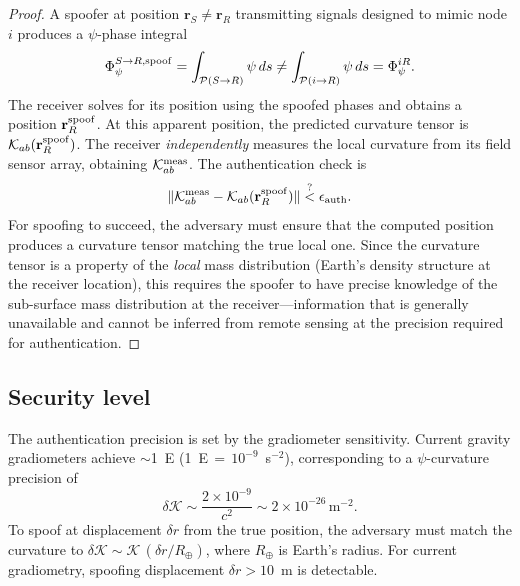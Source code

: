\documentclass[aps,prd,twocolumn,superscriptaddress,nofootinbib]{revtex4-2}
\begin{document}
\begin{proof}
A spoofer at position $\mathbf{r}_S \neq \mathbf{r}_R$ transmitting
signals designed to mimic node $i$ produces a $\psi$-phase integral
\begin{equation}
\Phi_{\psi}^{S\to R,\rm spoof} = \int_{\mathcal{P}(S\to R)} \psi\,ds
\neq \int_{\mathcal{P}(i\to R)} \psi\,ds = \Phi_\psi^{iR}.
\end{equation}
The receiver solves for its position using the spoofed phases and obtains
a position $\mathbf{r}_R^{\rm spoof}$. At this apparent position, the
predicted curvature tensor is
$\mathcal{K}_{ab}(\mathbf{r}_R^{\rm spoof})$. The receiver
\emph{independently} measures the local curvature from its field sensor
array, obtaining $\mathcal{K}_{ab}^{\rm meas}$. The authentication
check is
\begin{equation}\label{eq:auth-check}
\|\mathcal{K}_{ab}^{\rm meas} - \mathcal{K}_{ab}(\mathbf{r}_R^{\rm spoof})\|
\stackrel{?}{<} \epsilon_{\rm auth}.
\end{equation}
For spoofing to succeed, the adversary must ensure that the computed
position produces a curvature tensor matching the true local one.
Since the curvature tensor is a property of the \emph{local} mass
distribution (Earth's density structure at the receiver location),
this requires the spoofer to have precise knowledge of the
sub-surface mass distribution at the receiver---information that is
generally unavailable and cannot be inferred from remote sensing at
the precision required for authentication.
\end{proof}

\subsection{Security level}\label{sec:security}

The authentication precision is set by the gradiometer sensitivity.
Current gravity gradiometers achieve $\sim$1~E
(1~E$\,{=}\,10^{-9}$~s$^{-2}$), corresponding to a $\psi$-curvature
precision of
\begin{equation}
\delta\mathcal{K} \sim \frac{2\times 10^{-9}}{c^2}
\sim 2\times 10^{-26}\,\mathrm{m}^{-2}.
\end{equation}
To spoof at displacement $\delta r$ from the true position, the
adversary must match the curvature to
$\delta\mathcal{K} \sim \mathcal{K}\,(\delta r/R_{\oplus})$, where
$R_\oplus$ is Earth's radius. For current gradiometry,
spoofing displacement $\delta r > 10$~m is detectable.
\end{document}
